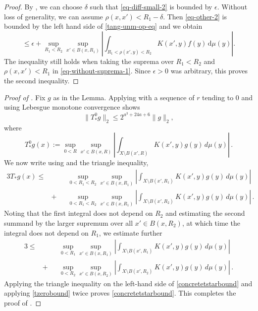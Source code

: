 \documentclass[10pt,a4paper]{article}
\theoremstyle{plain}
\theoremstyle{definition}
\numberwithin{equation}{subsection}
\newcommand{\proves}[1]{}
\newcommand{\leanok}{}
\begin{document}
\begin{proof}
By , we can choose $\delta$ such that \eqref{eq-diff-small-2} is bounded by $\epsilon$. Without loss of generality, we can assume $\rho(x,x')<R_1-\delta$. Then \eqref{eq-other-2} is bounded by the left hand side of \eqref{tang-unm-op-eq} and we obtain
\begin{equation*}
    \le \epsilon + \sup_{R_1 < R_2} \sup_{x'\in B(x,R_1)} \left|\int_{R_1<\rho(x',y)<R_2} K(x',y) f(y) \, \mathrm{d}\mu(y) \right| .
\end{equation*}
The inequality still holds when taking the suprema over $R_1<R_2$ and $\rho(x,x')<R_1$ in \eqref{eq-without-suprema-1}. Since $\epsilon>0$ was arbitrary, this proves the second inequality.
\end{proof}

\begin{proof}[Proof of ]
    \proves{nontangential-from-simple}
\leanok
Fix $g$ as in the Lemma.
Applying  with a
sequence of $r$ tending to $0$ and using Lebesgue monotone convergence shows
\begin{equation}\label{tzerobound}
    \|T_*^{0}g\|_2\le 2^{a^3+24a+6}\|g\|_2,
\end{equation}
where
\begin{equation}\label{eq-simpler--nontangential}
    T_*^{0} g(x):=\sup_{0<R}\sup_{x'\in B(x,R)} \left|\int_{X\setminus B(x',R)}
K(x',y) g(y)\, d\mu(y)\right|\, .
\end{equation}
We now write using  and the triangle inequality,
\begin{alignat*}{3}\label{concretetstartriangle}
    T_* g(x)\le&&&\sup_{0<R_1<R_2}\sup_{x'\in B(x,R_1)} \left|\int_{X\setminus B(x',R_1)}K(x',y) g(y)\, d\mu(y)\right| \\
&+&&\sup_{0<R_1<R_2}\sup_{x'\in B(x,R_1)} \left|\int_{X\setminus B(x',R_2)} K(x',y) g(y)\, d\mu(y)\right|\, .
\end{alignat*}
Noting that the first integral does not depend on $R_2$ and
estimating the second summand by the larger supremum over all
$x'\in B(x,R_2)$, at which time the integral does not depend on $R_1$, we estimate further
\begin{alignat*}{3}
    \le&&&\sup_{0<R_1}\sup_{x'\in B(x,R_1)} \left|\int_{X\setminus B(x',R_1)}K(x',y) g(y)\, d\mu(y)\right| \\
    &+  &&\sup_{0<R_2}\sup_{x'\in B(x,R_2)} \left|\int_{X\setminus B(x',R_2)} K(x',y) g(y)\, d\mu(y)\right|\, .
\end{alignat*}
    Applying the triangle inequality on the left-hand side
    of \eqref{concretetstarbound} and applying
     \eqref{tzerobound} twice
    proves \eqref{concretetstarbound}.
    This completes the proof of .
\end{proof}
\end{document}
